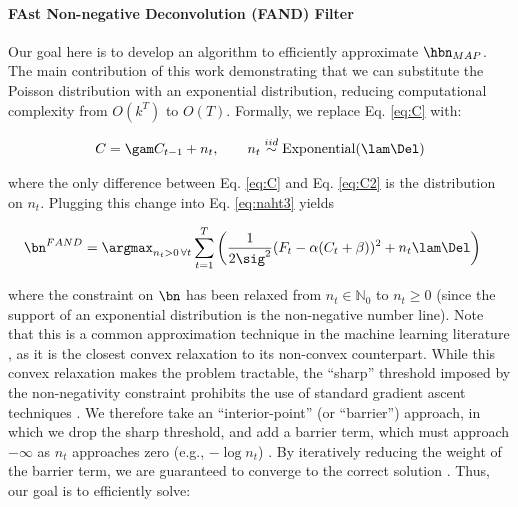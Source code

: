\paragraph{FAst Non-negative Deconvolution (FAND) Filter}

Our goal here is to develop an algorithm to efficiently approximate $\hbn_{MAP}$.  The main contribution of this work demonstrating that we can substitute the Poisson distribution with an exponential distribution, reducing computational complexity from $O(k^T)$ to $O(T)$.  Formally, we replace Eq. \eqref{eq:C} with:

\begin{align} \label{eq:C2}
	C = \gam C_{t-1} + n_t, \qquad n_t \overset{iid}{\sim} \text{Exponential}(\lam \Del)
\end{align}

\noindent where the only difference between Eq. \eqref{eq:C} and Eq. \eqref{eq:C2} is the distribution on $n_t$.  Plugging this change into Eq. \eqref{eq:naht3} yields

\begin{align} \label{eq:obj2}
\bn^{FAND} &= \argmax_{n_t>0 \, \forall t}  \sum_{t=1}^T \bigg( \frac{1}{2 \sig^2}(F_t - \alpha(C_t + \beta))^2  + n_t \lam \Del \bigg) %
\end{align}

\noindent where the constraint on $\bn$ has been relaxed from  $n_t \in \mathbb{N}_0$ to $n_t \geq 0$ (since the support of an exponential distribution is the non-negative number line).  Note that this is a common approximation technique in the machine learning literature \cite{HastieFriedman01}, as it is the closest convex relaxation to its non-convex counterpart. While this convex relaxation makes the problem tractable, the ``sharp'' threshold imposed by the non-negativity constraint prohibits the use of standard gradient ascent techniques \cite{BoydVandenberghe04}. We therefore take an ``interior-point'' (or ``barrier'') approach, in which we drop the sharp threshold, and add a barrier term, which must approach $-\infty$ as $n_t$ approaches zero (e.g., $-\log n_t$) \cite{BoydVandenberghe04}.  By iteratively reducing the weight of the barrier term, we are guaranteed to converge to the correct solution \cite{BoydVandenberghe04}.  Thus, our goal is to efficiently solve:

